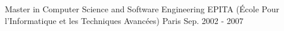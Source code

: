
\begin{cventries}

  \cventry
    {Master in Computer Science and Software Engineering} %
    {EPITA (École Pour l'Informatique et les Techniques Avancées)} %
    {Paris} %
    {Sep. 2002 - 2007} %
    {
    } %

\end{cventries}
